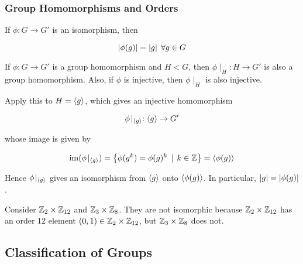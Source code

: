 \documentclass[a4paper,12pt]{article}
\begin{document}
\subsubsection{Group Homomorphisms and Orders}
\begin{pst}
  If $\phi:G\to G'$ is an isomorphism, then

  $$\left| \phi(g)\right|=\left| g\right|\;\forall g\in G$$\s

  \prf If $\phi:G\to G'$ is a group homomorphism and $H<G$, then $\phi\!\mid_{H}:H\to G'$ is also a group homomorphism. Also, if $\phi$ is injective, then $\phi\!\mid_{H}$ is also injective.\n

  Apply this to $H=\left\langle g\right\rangle$, which gives an injective homomorphism

  $$\phi\!\mid_{\left\langle g\right\rangle}:\left\langle g\right\rangle\to G'$$\s

  whose image is given by

  $$\mathrm{im}(\phi\!\mid_{\left\langle g\right\rangle})=\left\{ \phi(g^{k})=\phi(g)^{k}\,\mid\, k\in\mathbb{Z}\right\}=\left\langle \phi(g)\right\rangle$$\s

  Hence $\phi\!\mid_{\left\langle g\right\rangle}$ gives an isomorphism from $\left\langle g\right\rangle$ onto $\left\langle \phi(g)\right\rangle$. In particular, $\left| g\right|=\left| \phi(g)\right|$.
\end{pst}\n

\begin{exm}
  Consider $\mathbb{Z}_{2}\times\mathbb{Z}_{12}$ and $\mathbb{Z}_{3}\times\mathbb{Z}_{8}$. They are not isomorphic because $\mathbb{Z}_{2}\times\mathbb{Z}_{12}$ has an order $12$ element $(0,1)\in\mathbb{Z}_{2}\times\mathbb{Z}_{12}$, but $\mathbb{Z}_{3}\times\mathbb{Z}_{8}$ does not.
\end{exm}

\propdisp

\subsection{Classification of Groups}
\end{document}
